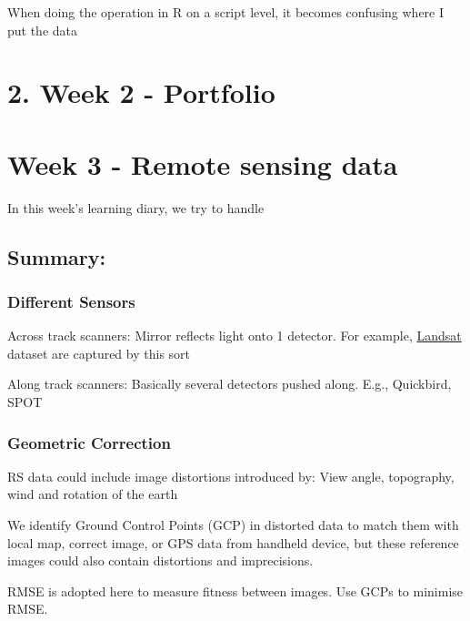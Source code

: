 \documentclass[
  letterpaper,
  DIV=11,
  numbers=noendperiod]{scrreprt}
\begin{document}
When doing the operation in R on a script level, it becomes confusing
where I put the data


\hypertarget{week-2---portfolio}{%
\chapter{2. Week 2 - Portfolio}\label{week-2---portfolio}}


\hypertarget{week-3---remote-sensing-data}{%
\chapter{Week 3 - Remote sensing
data}\label{week-3---remote-sensing-data}}

In this week's learning diary, we try to handle

\hypertarget{summary-1}{%
\section{Summary:}\label{summary-1}}

\hypertarget{different-sensors}{%
\subsection{Different Sensors}\label{different-sensors}}

Across track scanners: Mirror reflects light onto 1 detector. For
example, \uline{Landsat} dataset are captured by this sort

Along track scanners: Basically several detectors pushed along. E.g.,
Quickbird, SPOT

\hypertarget{geometric-correction}{%
\subsection{Geometric Correction}\label{geometric-correction}}

RS data could include image distortions introduced by: View angle,
topography, wind and rotation of the earth

We identify Ground Control Points (GCP) in distorted data to match them
with local map, correct image, or GPS data from handheld device, but
these reference images could also contain distortions and imprecisions.

RMSE is adopted here to measure fitness between images. Use GCPs to
minimise RMSE.
\end{document}
